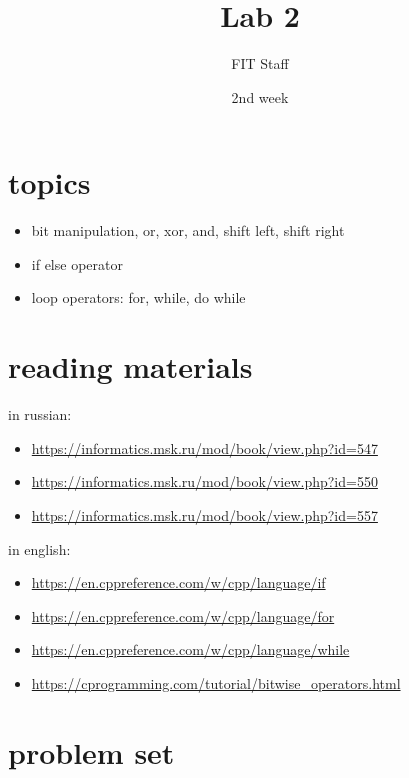 \documentclass[12pt]{article}%
\title{Lab 2}
\date {2nd week}
\author{FIT Staff}
\begin{document}
    \maketitle
    \section{topics}
    \begin{itemize}
        \item bit manipulation, or, xor, and, shift left, shift right
        \item if else operator
        \item loop operators: for, while, do while
    \end{itemize}
    
    \section{reading materials}
    in russian:
    \begin{itemize}
        \item \url{https://informatics.msk.ru/mod/book/view.php?id=547}
        \item \url{https://informatics.msk.ru/mod/book/view.php?id=550}
        \item \url{https://informatics.msk.ru/mod/book/view.php?id=557}
    \end{itemize}
    in english:
    \begin{itemize}
        \item \url{https://en.cppreference.com/w/cpp/language/if}
        \item \url{https://en.cppreference.com/w/cpp/language/for}
        \item \url{https://en.cppreference.com/w/cpp/language/while}
        \item \url{https://cprogramming.com/tutorial/bitwise_operators.html}
    \end{itemize}

    \section{problem set}
    
    
    
    
    
    
    
    
    
    
    
    
    
    
    
\end{document}
